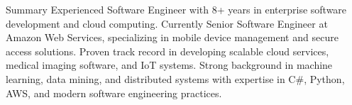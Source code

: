 
\begin{category}{Summary}
\citem{} Experienced Software Engineer with 8+ years in enterprise software development and cloud computing. Currently Senior Software Engineer at Amazon Web Services, specializing in mobile device management and secure access solutions. Proven track record in developing scalable cloud services, medical imaging software, and IoT systems. Strong background in machine learning, data mining, and distributed systems with expertise in C\#, Python, AWS, and modern software engineering practices.
\end{category}
